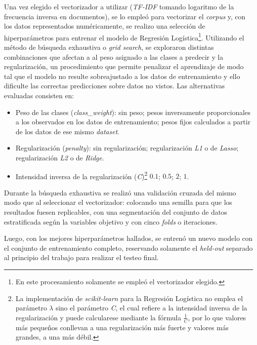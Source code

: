 Una vez elegido el vectorizador a utilizar (\textit{TF-IDF} tomando
logaritmo de la frecuencia inversa en documentos), se lo emple\'o para
vectorizar el \textit{corpus} y, con los datos representados
num\'ericamente, se realizo una selecci\'on
de hiperpar\'ametros para entrenar el modelo de Regresi\'on Log\'istica\footnote{
En este procesamiento solamente se emple\'o el vectorizador elegido.}.
Utilizando el m\'etodo de b\'usqueda exhaustiva o \textit{grid search}, se
exploraron distintas combinaciones que afectan a
al peso asignado a las clases a predecir y la regularizaci\'on,
un procedimiento que permite penalizar el aprendizaje de modo tal que
el modelo no resulte sobreajustado a los datos de entrenamiento y ello
dificulte las correctas predicciones sobre datos no vistos. Las
alternativas evaluadas consisten en:

\begin{itemize}
    \item Peso de las clases (\textit{class\_weight}): sin peso; pesos
    inversamente proporcionales a los observados en los datos de entrenamiento;
    pesos fijos calculados a partir de los datos de ese mismo \textit{dataset}.    
    \item Regularizaci\'on (\textit{penalty}): sin regularizaci\'on;
    regularizaci\'on \textit{L1}
    o de \textit{Lasso}; regularizaci\'on \textit{L2} o de \textit{Ridge}.
    \item Intensidad inversa de la regularizaci\'on (\textit{C})\footnote{
    La implementaci\'on de \textit{scikit-learn} para la Regresi\'on
    Log\'istica no emplea el par\'ametro $\lambda$ sino el par\'ametro \textit{C},
    el cual refiere a la intensidad inversa de la regularizaci\'on y puede
    calcularese mediante la f\'ormula $\frac{1}{C}$, por lo que valores
    m\'as pequeños conllevan a una regularizaci\'on m\'as fuerte y valores m\'as
    grandes, a una m\'as d\'ebil.}
     $0.1$; $0.5$; $2$; $1$.
\end{itemize}

Durante la b\'usqueda exhaustiva se realiz\'o una validaci\'on cruzada del mismo
modo que al seleccionar el vectorizador: colocando una semilla para que los
resultados fuesen replicables, con una segmentaci\'on del conjunto de datos
estratificada seg\'un la variables objetivo y con cinco \textit{folds} o
iteraciones.
\par
Luego, con los mejores hiperpar\'ametros hallados, se entren\'o un nuevo modelo
con el conjunto de entrenamiento completo, reservando solamente el
\textit{held-out} separado al principio del trabajo
para realizar el testeo final.
